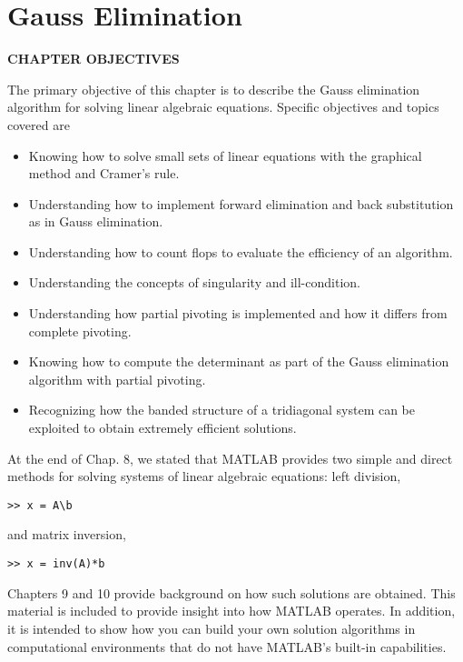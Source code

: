 \documentclass[../main.tex]{subfiles}
\begin{document}
\theoremstyle{definition}

\chapter{Gauss Elimination}
\label{cha9:cha9}
\begin{center}
\Large{\textbf{CHAPTER OBJECTIVES}}
\end{center}

The primary objective of this chapter is to describe the Gauss elimination algorithm for solving linear algebraic equations. Specific objectives and topics covered are
\begin{itemize}
\item Knowing how to solve small sets of linear equations with the graphical method and Cramer's rule.
\item Understanding how to implement forward elimination and back substitution as in Gauss elimination.
\item Understanding how to count flops to evaluate the efficiency of an algorithm.
\item Understanding the concepts of singularity and ill-condition.
\item Understanding how partial pivoting is implemented and how it differs from complete pivoting.
\item Knowing how to compute the determinant as part of the Gauss elimination algorithm with partial pivoting.
\item Recognizing how the banded structure of a tridiagonal system can be exploited to obtain extremely efficient solutions.
\end{itemize}
\bigskip

At the end of Chap. 8, we stated that MATLAB provides two simple and direct methods for solving systems of linear algebraic equations: left division,

\begin{lstlisting}[numbers=none,frame=none]
    >> x = A\b
\end{lstlisting}

and matrix inversion,

\begin{lstlisting}[numbers=none,frame=none]
    >> x = inv(A)*b
\end{lstlisting}

Chapters 9 and 10 provide background on how such solutions are obtained. This material is included to provide insight into how MATLAB operates. In addition, it is intended to show how you can build your own solution algorithms in computational environments that do not have MATLAB's built-in capabilities.
\end{document}
